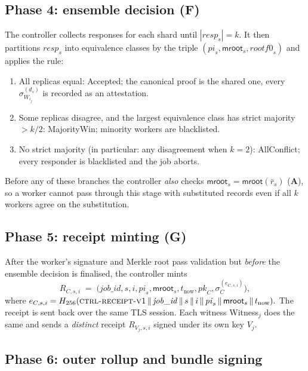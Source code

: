 \documentclass[11pt,a4paper]{article}
\theoremstyle{definition}
\theoremstyle{plain}
\newcommand{\msg}[1]{\textsf{#1}}
\newcommand{\witness}{\msg{Witness}}
\newcommand{\hash}{\ensuremath{H}}
\newcommand{\sig}[2]{\ensuremath{\sigma_{#1}^{(#2)}}}
\newcommand{\concat}{\,\Vert\,}
\begin{document}
\subsection{Phase 4: ensemble decision (F)}

The controller collects responses for each shard until $|\mathit{resp}_s|
= k$.  It then partitions $\mathit{resp}_s$ into equivalence classes by
the triple $(\mathit{pi}_s, \mathsf{mroot}_s, \mathit{rootf0}_s)$ and
applies the rule:
\begin{enumerate}[leftmargin=*]
  \item All replicas equal: \msg{Accepted}; the canonical proof is the
        shared one, every $\sig{W_{i_j}}{d_s}$ is recorded as an
        attestation.
  \item Some replicas disagree, and the largest equivalence class has
        strict majority $> k/2$: \msg{MajorityWin}; minority workers
        are blacklisted.
  \item No strict majority (in particular: any disagreement when
        $k = 2$): \msg{AllConflict}; every responder is blacklisted
        and the job aborts.
\end{enumerate}
Before any of these branches the controller \emph{also} checks
$\mathsf{mroot}_s = \mathsf{mroot}(\bar{r}_s)$ (\textbf{A}), so a worker
cannot pass through this stage with substituted records even if all
$k$ workers agree on the substitution.

\subsection{Phase 5: receipt minting (G)}

After the worker's signature and Merkle root pass validation but
\emph{before} the ensemble decision is finalised, the controller mints
\begin{equation}
  R_{C,s,i} \;=\; \bigl(\mathit{job\_id}, s, i, \mathit{pi}_s,
       \mathsf{mroot}_s, t_{\text{now}}, \mathit{pk}_C,
       \sig{C}{e_{C,s,i}}\bigr),
  \label{eq:receipt}
\end{equation}
where
\(
  e_{C,s,i} = \hash_{256}(\textsc{ctrl-receipt-v1} \concat \mathit{job\_id}
       \concat s \concat i \concat \mathit{pi}_s \concat
       \mathsf{mroot}_s \concat t_{\text{now}}).
\)
The receipt is sent back over the same TLS session.  Each witness
\witness$_j$ does the same and sends a \emph{distinct} receipt
$R_{V_j, s, i}$ signed under its own key $V_j$.

\subsection{Phase 6: outer rollup and bundle signing}
\end{document}
